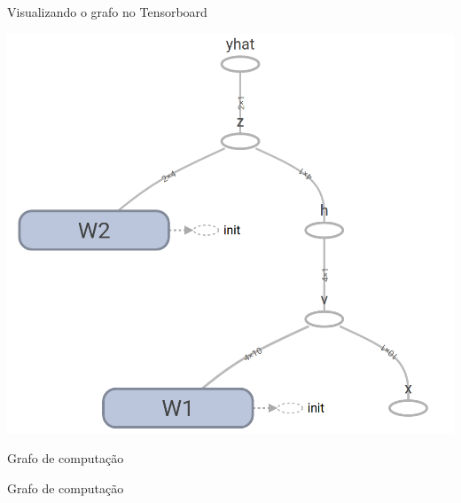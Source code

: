\documentclass[10pt]{beamer}
\begin{document}
\begin{frame}[fragile]{Visualizando o grafo no Tensorboard}
\begin{center}
\includegraphics[scale=0.255]{images/basic_tf_graph.png}
\end{center}
\end{frame}

\begin{frame}[fragile]{Grafo de computação}

\end{frame}

\begin{frame}[fragile]{Grafo de computação}

\end{frame}
\end{document}
